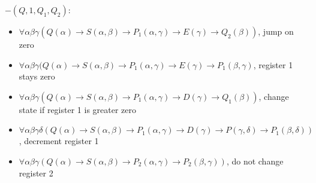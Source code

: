 $-(Q,1,Q_1,Q_2):$
\begin{itemize}
\item $\forall\alpha\beta\gamma(Q(\alpha)\to S(\alpha,\beta)\to P_1(\alpha,\gamma)\to E(\gamma)\to Q_2(\beta))$, jump on zero
\item $\forall\alpha\beta\gamma(Q(\alpha)\to S(\alpha,\beta)\to P_1(\alpha,\gamma)\to E(\gamma)\to P_1(\beta,\gamma)$, register 1 stays zero
\item $\forall\alpha\beta\gamma(Q(\alpha)\to S(\alpha,\beta)\to P_1(\alpha,\gamma)\to D(\gamma)\to Q_1(\beta))$, change state if register 1 is greater zero
\item $\forall\alpha\beta\gamma\delta(Q(\alpha)\to S(\alpha,\beta)\to P_1(\alpha,\gamma)\to D(\gamma) \to P(\gamma,\delta)\to P_1(\beta,\delta))$, decrement register 1
\item $\forall\alpha\beta\gamma(Q(\alpha)\to S(\alpha,\beta)\to P_2(\alpha,\gamma)\to P_2(\beta,\gamma))$, do not change register 2
\end{itemize}

